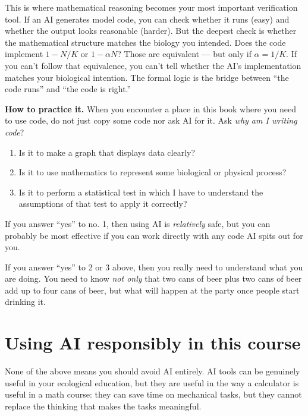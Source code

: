 \documentclass[
  letterpaper,
  DIV=11,
  numbers=noendperiod]{scrreprt}
\providecommand{\tightlist}{%
  \setlength{\itemsep}{0pt}\setlength{\parskip}{0pt}}
\begin{document}
This is where mathematical reasoning becomes your most important
verification tool. If an AI generates model code, you can check whether
it runs (easy) and whether the output looks reasonable (harder). But the
deepest check is whether the mathematical structure matches the biology
you intended. Does the code implement \(1 - N/K\) or \(1 - \alpha N\)?
Those are equivalent --- but only if \(\alpha = 1/K\). If you can't
follow that equivalence, you can't tell whether the AI's implementation
matches your biological intention. The formal logic is the bridge
between ``the code runs'' and ``the code is right.''

\textbf{How to practice it.} When you encounter a place in this book
where you need to use code, do not just copy some code nor ask AI for
it. Ask \emph{why am I writing code}?

\begin{enumerate}
\def\labelenumi{\arabic{enumi}.}
\tightlist
\item
  Is it to make a graph that displays data clearly?
\item
  Is it to use mathematics to represent some biological or physical
  process?
\item
  Is it to perform a statistical test in which I have to understand the
  assumptions of that test to apply it correctly?
\end{enumerate}

If you answer ``yes'' to no. 1, then using AI is \emph{relatively} safe,
but you can probably be most effective if you can work directly with any
code AI spits out for you.

If you answer ``yes'' to 2 or 3 above, then you really need to
understand what you are doing. You need to know \emph{not only} that two
cans of beer plus two cans of beer add up to four cans of beer, but what
will happen at the party once people start drinking it.

\section{Using AI responsibly in this
course}\label{using-ai-responsibly-in-this-course}

None of the above means you should avoid AI entirely. AI tools can be
genuinely useful in your ecological education, but they are useful in
the way a calculator is useful in a math course: they can save time on
mechanical tasks, but they cannot replace the thinking that makes the
tasks meaningful.
\end{document}
